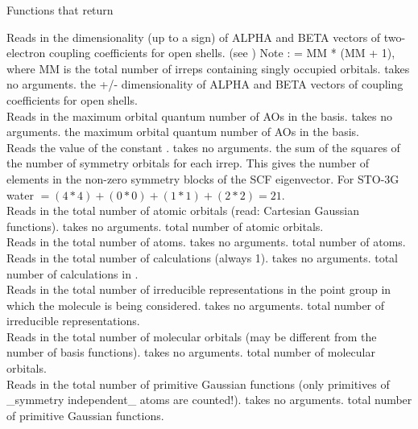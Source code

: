 \begin{center}
Functions that return 
\end{center}
{Reads in the dimensionality (up to a sign) of ALPHA and BETA vectors of 
two-electron coupling coefficients for open shells. (see )
Note :  = MM * (MM + 1), where MM is the total number of
irreps containing singly occupied orbitals.}
{takes no arguments.}
{the +/- dimensionality of ALPHA and BETA vectors of 
coupling coefficients for open shells.} \\
{Reads in the maximum orbital quantum number of AOs in the basis.}
{takes no arguments.}
{the maximum orbital quantum number of AOs in the basis.} \\
{Reads the value of the constant .}
{takes no arguments.}
{the sum of the squares of the number of symmetry
orbitals for each irrep.  This gives the number of elements in the
non-zero symmetry blocks of the SCF eigenvector.  For STO-3G water
$ = (4*4) + (0*0) + (1*1) + (2*2) = 21$.} \\
{Reads in the total number of atomic orbitals (read: Cartesian Gaussian functions).}
{takes no arguments.}
{total number of atomic orbitals.} \\
{Reads in the total number of atoms.}
{takes no arguments.}
{total number of atoms.} \\
{Reads in the total number of calculations (always 1).}
{takes no arguments.}
{total number of calculations in .} \\
{Reads in the total number of irreducible representations
in the point group in which the molecule is being considered.}
{takes no arguments.}
{total number of irreducible representations.} \\
{Reads in the total number of molecular orbitals (may be different
from the number of basis functions).}
{takes no arguments.}
{total number of molecular orbitals.} \\
{Reads in the total number of primitive Gaussian functions 
(only primitives of \_symmetry independent\_ atoms are counted!).}
{takes no arguments.}
{total number of primitive Gaussian functions.} \\
